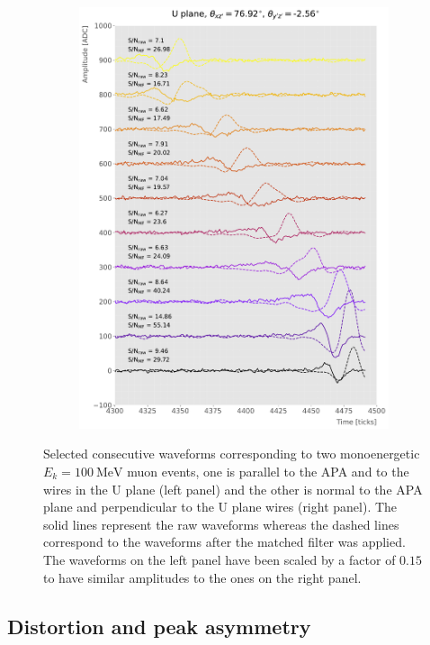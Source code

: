 \begin{figure}[t]
\begin{subfigure}{0.5\textwidth}
		\includegraphics[width=.99\linewidth]{Images/Matched_Filter/evt_xz_90_yz_0_U}
	\end{subfigure}
	\caption[Waveforms for two muon events, one parallel to the APA and to the wires in the U plane and other normal to the APA plane and perpendicular to the U plane wires.]{Selected consecutive waveforms corresponding to two monoenergetic $E_{k} = 100 \ \mathrm{MeV}$ muon events, one is parallel to the APA and to the wires in the U plane (left panel) and the other is normal to the APA plane and perpendicular to the U plane wires (right panel). The solid lines represent the raw waveforms whereas the dashed lines correspond to the waveforms after the matched filter was applied. The waveforms on the left panel have been scaled by a factor of $0.15$ to have similar amplitudes to the ones on the right panel.}
	\label{fig:example_orientation}
\end{figure}

\subsection{Distortion and peak asymmetry}
\label{sec:A.5}

